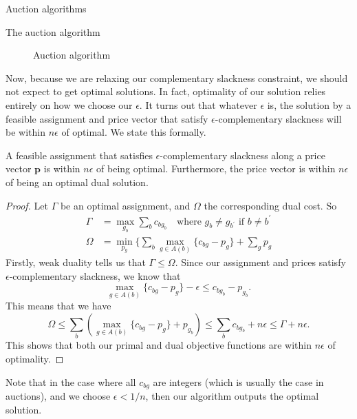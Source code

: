 \begin{section}{Auction algorithms}
\begin{subsection}{The auction algorithm}
		\singlespace
		\begin{figure}[h]
		\centering
			\noindent{}
			\caption{Auction algorithm}
		\end{figure}
		\doublespacing
		Now, because we are relaxing our complementary slackness constraint, we should not 
		expect to get optimal solutions. In fact, optimality of our solution relies entirely on 
		how we choose our $\epsilon$. It turns out that whatever $\epsilon$ is, the solution 
		by a feasible assignment and price vector that satisfy $\epsilon$-complementary 
		slackness will be within $n\epsilon$ of optimal. We state this formally.

		\begin{theorem}
			A feasible assignment that satisfies $\epsilon$-complementary slackness along 
			a price vector $\mathbf{p}$ is within $n\epsilon$ of being optimal. 
			Furthermore, the price vector is within $n\epsilon$ of being an optimal dual 
			solution.
		\end{theorem}
		\begin{proof}
			Let $\Gamma$ be an optimal assignment, and $\Omega$ the corresponding dual cost. 
			So 
			\begin{align}
				\Gamma &= \max_{g_b} \sum_b c_{bg_b} \quad \text{where $g_b\neq 
				g_{b^{'}}$ if $b\neq b^{'}$}\\
				\Omega &= \min_{p_g} \{\sum_b \max_{g\in A(b)} \{c_{bg} - p_g\} + 
				\sum_g p_g
			\end{align}
			Firstly, weak duality tells us that $\Gamma \leq \Omega$. Since our assignment 
			and prices satisfy $\epsilon$-complementary slackness, we know that 
			\[
				\max_{g\in A(b)} \{c_{bg} - p_g\} - \epsilon \leq c_{bg_b} - p_{g_b}.
			\]
			This means that we have 
			\[
				\Omega \leq \sum_b \left(\max_{g\in A(b)} \{c_{bg} - p_g\} + p_{g_b} 
				\right) \leq \sum_b c_{bg_b} + n\epsilon \leq \Gamma + n\epsilon.
			\]
			This shows that both our primal and dual objective functions are within 
			$n\epsilon$ of optimality.
		\end{proof}
		Note that in the case where all $c_{bg}$ are integers (which is usually the case in 
		auctions), and we choose $\epsilon < 1/n$, then our algorithm outputs the optimal 
		solution. 
\end{subsection}
\end{section}
